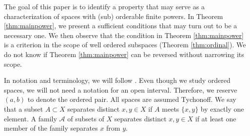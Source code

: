 \documentclass[12pt]{amsart}
\begin{document}
The goal of this paper is to identify a property that may serve as a characterization of spaces with (sub) orderable finite powers. In Theorem \ref{thm:mainpower}, we present a sufficient conditions that may turn out to be a necessary one.  We then observe that the condition in Theorem \ref{thm:mainpower} is a criterion  in the scope of well ordered subspaces (Theorem \ref{thm:ordinal}). We do not know if Theorem \ref{thm:mainpower} can be reversed without narrowing its scope.

In notation and terminology, we will follow \cite{Eng}. Even though we study ordered spaces, we will not need a notation for an open interval. Therefore, we reserve $(a,b)$ to denote the ordered pair. All spaces are assumed Tychonoff. We say that a subset $A\subset X$ separates distinct $x,y\in X$ if $A$ meets $\{x,y\}$ by exactly one element. A family $\mathcal A$ of subsets of $X$ separates distinct $x,y\in X$ if at least one member of the family separates $x$ from $y$.
\end{document}
